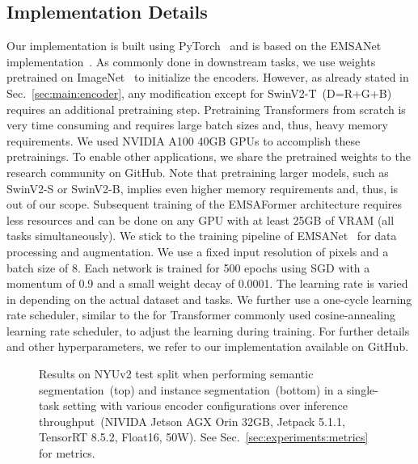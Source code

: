 \documentclass[conference]{IEEEtran}
\begin{document}
\subsection{Implementation Details}
\label{sec:experiments:implementation}
Our implementation is built using PyTorch~\cite{pytorch-neurips2019} and is based on the EMSANet implementation~\cite{emsanet2022ijcnn}.
As commonly done in downstream tasks, we use weights pretrained on ImageNet~\cite{ImageNet-ijcv2015} to initialize the encoders.
However, as already stated in Sec.~\ref{sec:main:encoder}, any modification except for SwinV2-T~(D=R+G+B) requires an additional pretraining step. 
Pretraining Transformers from scratch is very time consuming and requires large batch sizes and, thus, heavy memory requirements. 
We used  NVIDIA A100 40GB GPUs to accomplish these pretrainings.
To enable other applications, we share the pretrained weights to the research community on GitHub.
Note that pretraining larger models, such as SwinV2-S or SwinV2-B, implies even higher memory requirements and, thus, is out of our scope.
Subsequent training of the EMSAFormer architecture requires less resources and can be done on any GPU with at least 25GB of VRAM (all tasks simultaneously).
We stick to the training pipeline of EMSANet~\cite{emsanet2022ijcnn} for data processing and augmentation. 
We use a fixed input resolution of  pixels and a batch size of 8.
Each network is trained for 500 epochs using SGD with a momentum of 0.9 and a small weight decay of 0.0001.
The learning rate is varied in  depending on the actual dataset and tasks.
We further use a one-cycle learning rate scheduler, similar to the for Transformer commonly used cosine-annealing learning rate scheduler, to adjust the learning during training.
For further details and other hyperparameters, we refer to our implementation available on GitHub.
\begin{figure*}[!b]
	\centering \vspace{-4.5mm}
	\vspace{-8.5mm}
	\caption{Results on NYUv2 test split when performing semantic segmentation~(top) and instance segmentation~(bottom) in a single-task setting with various encoder configurations over inference throughput~(NIVIDA Jetson AGX Orin 32GB, Jetpack 5.1.1, TensorRT 8.5.2, Float16, 50W). See Sec.~\ref{sec:experiments:metrics} for metrics.}
	\label{fig:single_task}
\end{figure*}
\end{document}
